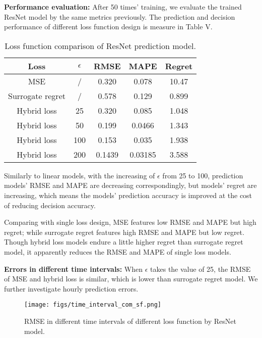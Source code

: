 \documentclass[journal]{IEEEtran}
\begin{document}
\textbf{Performance evaluation:}
After 50 times' training, we evaluate the trained ResNet model by the same metrics previously. The prediction and decision performance of different loss function design is measure in Table V. 

\begin{table}[ht]
  \renewcommand{\arraystretch}{1.3}
  \centering
  \label{ResNet_comparison}
  \caption{Loss function comparison of ResNet prediction model.}
  \begin{tabular}{ccccc}
    \hline
    Loss & $\epsilon$ & RMSE & MAPE & Regret \\
    \hline
    MSE & / & 0.320 & 0.078 & 10.47 \\
    Surrogate regret & / & 0.578 & 0.129 & 0.899 \\
    Hybrid loss & 25 & 0.320 & 0.085 & 1.048 \\
    Hybrid loss & 50 & 0.199 & 0.0466 & 1.343  \\
    Hybrid loss & 100 & 0.153 & 0.035 & 1.938  \\
    Hybrid loss & 200 & 0.1439 & 0.03185 & 3.588   \\
    \hline
  \end{tabular}
\end{table}

Similarly to linear models, with the increasing of $\epsilon$ from 25 to 100, prediction models' RMSE and MAPE are decreasing correspondingly, but models' regret are increasing, which means the models' prediction accuracy is improved at the cost of reducing decision accuracy. 

Comparing with single loss design, MSE features low RMSE and MAPE but high regret; while surrogate regret features high RMSE and MAPE but low regret. Though hybrid loss models endure a little higher regret than surrogate regret model, it apparently reduces the RMSE and MAPE of single loss models. 

\textbf{Errors in different time intervals:} When $\epsilon$ takes the value of 25, the RMSE of MSE and hybrid loss is similar, which is lower than surrogate regret model. We further investigate hourly prediction errors.

\begin{figure}[ht]
  \centering
  \texttt{[image: figs/time\_interval\_com\_sf.png]}
  \caption{RMSE in different time intervals of different loss function by ResNet model.}
  \label{interval_comparison_Res}
\end{figure}
\end{document}
